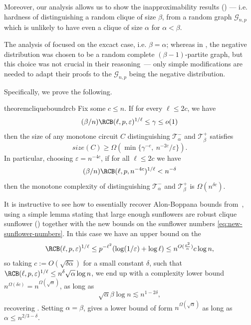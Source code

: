 Moreover, our analysis allows us to show the inapproximability results () --- i.e. hardness of distinguishing a random clique of size $\beta$, from a random graph $\mathcal{G}_{n,p}$ which is unlikely to have even a clique of size $\alpha$ for $\alpha < \beta$. 

The analysis of \cite{razborov1985lower,cavalar2022} focused on the excact case, i.e. $\beta = \alpha$; whereas in \cite{razborov1985lower,alon87}, the negative distribution was chosen to be a random complete $(\beta-1)$-partite graph, but this choice was not crucial in their reasoning~--- only simple modifications are needed to adapt their proofs to the $\mathcal{G}_{n,p}$ being the negative distribution.

Specifically, we prove the following.
\begin{restatable}{theorem}{cliqueboundrcb}
\label{thm:clique-bound-rcb}
    Fix some $c \leq n$.  If for every $\ell \leq 2c$, we have
    $$(\beta / n) \RCB(\ell, p, \varepsilon)^{1/\ell} \leq \gamma \leq o(1)$$
    then the size of any monotone circuit $C$ distinguishing $\mathcal{T}^-_\alpha$ and $\mathcal{T}^+_\beta$ satisfies
    $$size(C) \geq \Omega(\min\{\gamma^{-c}, \ n^{-2c}/\varepsilon \}).$$
    In particular, choosing $\varepsilon = n^{-4c}$, if for all $\ell \leq 2 c$ we have
    \begin{equation*}
        (\beta / n) \RCB(\ell, p, n^{-4 c})^{1/\ell} < n^{-\delta}
    \end{equation*}
    then the monotone complexity of distinguishing $\mathcal{T}^-_\alpha$ and $\mathcal{T}^+_\beta$ is  $\Omega(n^{\delta c})$.
\end{restatable}

It is instructive to see how to essentially recover Alon-Boppana bounds from~, using a simple lemma stating that large enough sunflowers are robust clique sunflower () together with the new bounds on the sunflower numbers \eqref{eq:new-sunflower-numbers}. In this case we have an upper bound on the \begin{equation*}
\RCB(\ell, p, \varepsilon)^{1/\ell} \leq p^{-\ell^2} (\log(1/\varepsilon) + \log \ell) \leq n^{O(\frac{c^2}{\alpha})} c \log n,
\end{equation*}
so taking $c := O(\sqrt{\delta \alpha})$ for a small constant $\delta$, such that $\RCB(\ell, p, \varepsilon)^{1/\ell} \leq n^{\delta} \sqrt{\alpha} \log n$, we end up with a complexity lower bound $n^{\Omega(\delta c)} = n^{\Omega(\sqrt{\alpha})}$, as long as
\begin{equation*}
    \sqrt{\alpha} \beta \log n \lesssim n^{1 - 2\delta},
\end{equation*}
recovering \cite[Theorem 3.11]{alon87}. Setting $\alpha = \beta$, gives a lower bound of form $n^{\Omega(\sqrt{\alpha})}$ as long as $\alpha \leq n^{2/3 - \delta}$.

